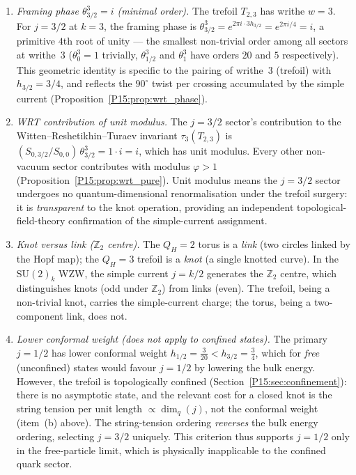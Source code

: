 \documentclass[11pt,a4paper]{article}
\theoremstyle{definition}\newtheorem{definition}[theorem]{Definition}
\theoremstyle{remark}
\newcommand{\vp}{\varphi}
\newcommand{\QH}{Q_H}
\begin{document}
\begin{enumerate}[label=\textup{(\alph*)}]
\item \emph{Framing phase $\theta_{3/2}^3=i$ (minimal order).}
  The trefoil $T_{2,3}$ has writhe $w=3$.
  For $j=3/2$ at $k=3$, the framing phase is
  $\theta_{3/2}^3 = e^{2\pi i\cdot 3h_{3/2}} = e^{2\pi i/4}=i$,
  a primitive $4$th root of unity --- the smallest non-trivial order
  among all sectors at writhe~$3$ ($\theta_0^3=1$ trivially,
  $\theta_{1/2}^3$ and $\theta_1^3$ have orders $20$ and $5$
  respectively).
  This geometric identity is specific to the pairing of
  writhe~$3$ (trefoil) with $h_{3/2}=3/4$,
  and reflects the $90^\circ$ twist per crossing accumulated by the
  simple current (Proposition~\ref{P15:prop:wrt_phase}).

\item \emph{WRT contribution of unit modulus.}
  The $j=3/2$ sector's contribution to the
  Witten--Reshetikhin--Turaev invariant $\tau_3(T_{2,3})$ is
  $(S_{0,3/2}/S_{0,0})\,\theta_{3/2}^3 = 1\cdot i = i$,
  which has unit modulus.
  Every other non-vacuum sector contributes with modulus $\vp>1$
  (Proposition~\ref{P15:prop:wrt_pure}).
  Unit modulus means the $j=3/2$ sector undergoes no
  quantum-dimensional renormalisation under the trefoil surgery:
  it is \emph{transparent} to the knot operation, providing an
  independent topological-field-theory confirmation of the
  simple-current assignment.

\item \emph{Knot versus link ($\mathbb{Z}_2$ centre).}
  The $\QH=2$ torus is a \emph{link} (two circles linked
  by the Hopf map); the $\QH=3$ trefoil is a \emph{knot}
  (a single knotted curve).
  In the $\mathrm{SU}(2)_k$ WZW, the simple current $j=k/2$ generates
  the $\mathbb{Z}_2$ centre, which distinguishes
  knots (odd under $\mathbb{Z}_2$) from links (even).
  The trefoil, being a non-trivial knot, carries the
  simple-current charge; the torus, being a two-component link,
  does not.

\item \emph{Lower conformal weight (does not apply to confined states).}
  The primary $j=1/2$ has lower conformal weight
  $h_{1/2}=\tfrac{3}{20}<h_{3/2}=\tfrac{3}{4}$, which for
  \emph{free} (unconfined) states would favour $j=1/2$ by lowering
  the bulk energy.
  However, the trefoil is topologically confined
  (Section~\ref{P15:sec:confinement}): there is no asymptotic state,
  and the relevant cost for a closed knot is the string tension per
  unit length $\propto\dim_q(j)$, not the conformal weight (item~(b)
  above).
  The string-tension ordering \emph{reverses} the bulk energy
  ordering, selecting $j=3/2$ uniquely.
  This criterion thus supports $j=1/2$ only in the free-particle
  limit, which is physically inapplicable to the confined quark sector.
\end{enumerate}
\end{document}

